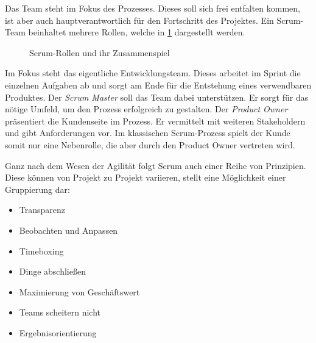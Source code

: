 Das Team steht im Fokus des Prozesses. Dieses soll sich frei entfalten kommen, ist aber auch hauptverantwortlich für den Fortschritt des Projektes. Ein Scrum-Team beinhaltet mehrere Rollen, welche in \ref{fig:scrumrollen} dargestellt werden. 

\begin{figure}[H]
	\centering
	\caption[Scrum-Rollen und ihr Zusammenspiel]{Scrum-Rollen und ihr Zusammenspiel \protect \cite[S. 36]{wirdemann_scrum_2017}}
	\label{fig:scrumrollen}
\end{figure}

Im Fokus steht das eigentliche Entwicklungsteam. Dieses arbeitet im Sprint die einzelnen Aufgaben ab und sorgt am Ende für die Entstehung eines verwendbaren Produktes. Der \textit{Scrum Master} soll das Team dabei unterstützen. Er sorgt für das nötige Umfeld, um den Prozess erfolgreich zu gestalten. Der \textit{Product Owner} präsentiert die Kundenseite im Prozess. Er vermittelt mit weiteren Stakeholdern und gibt Anforderungen vor. Im klassischen Scrum-Prozess spielt der Kunde somit nur eine Nebenrolle, die aber durch den Product Owner vertreten wird. 

Ganz nach dem Wesen der Agilität folgt Scrum auch einer  Reihe von Prinzipien. Diese können von Projekt zu Projekt variieren,  stellt eine Möglichkeit einer Gruppierung dar:

\begin{itemize}[noitemsep, topsep=0pt]
	\item Transparenz
	\item Beobachten und Anpassen
	\item Timeboxing
	\item Dinge abschließen
	\item Maximierung von Geschäftswert
	\item Teams scheitern nicht
	\item Ergebnisorientierung
\end{itemize}


